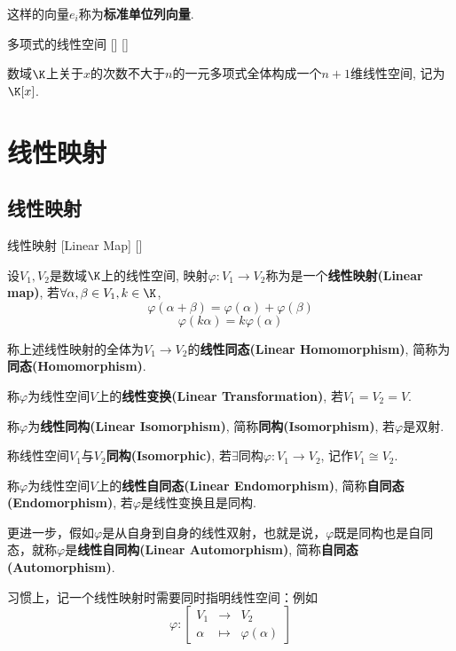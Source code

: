 \documentclass[UTF8]{ctexart}
\begin{document}
\begin{xmp}
			这样的向量$e_i$称为\textbf{标准单位列向量}. 
		\end{xmp}
		
		\begin{xmp}
			[]
			{多项式的线性空间}
			[]
			[]

			数域$\K$上关于$x$的次数不大于$n$的一元多项式全体构成一个$n+1$维线性空间, 记为$\K[x]$. 
		\end{xmp}
		
		
		
\section{线性映射}

	\subsection{线性映射}
		
		\begin{dfn}
			[]
			{线性映射}
			[Linear Map]
			[]

			设$V_{1},V_{2}$是数域$\K$上的线性空间, 映射$\varphi: V_{1}\to V_{2}$称为是一个\textbf{线性映射(Linear map)}, 若$\forall \alpha, \beta\in V_{1}, k\in \K$, 
			\[\varphi (\alpha+\beta)=\varphi(\alpha)+\varphi(\beta)\]
			\[\varphi(k\alpha)=k\varphi(\alpha)\]

			称上述线性映射的全体为$V_1\to V_2$的\textbf{线性同态(Linear Homomorphism)}, 简称为\textbf{同态(Homomorphism)}.
			
			称$\varphi$为线性空间$V$上的\textbf{线性变换(Linear Transformation)}, 若$V_{1}=V_{2}=V$. 
			
			称$\varphi$为\textbf{线性同构(Linear Isomorphism)}, 简称\textbf{同构(Isomorphism)}, 若$\varphi$是双射. 
			
			称线性空间$V_1$与$V_2$\textbf{同构(Isomorphic)}, 若$\exists$同构$\varphi:V_1\to V_2$, 记作$V_1\cong V_2$. 
			
			称$\varphi$为线性空间$V$上的\textbf{线性自同态(Linear Endomorphism)}, 简称\textbf{自同态(Endomorphism)}, 若$\varphi$是线性变换且是同构. 

			更进一步，假如$\varphi$是从自身到自身的线性双射，也就是说，$\varphi$既是同构也是自同态，就称$\varphi$是\textbf{线性自同构(Linear Automorphism)}, 简称\textbf{自同态(Automorphism)}.
		\end{dfn}

		习惯上，记一个线性映射时需要同时指明线性空间：例如
		\[\varphi:\begin{bmatrix}
			V_1&\to&V_2\\
			\alpha&\mapsto&\varphi(\alpha)
		\end{bmatrix}\]
		
\end{document}
